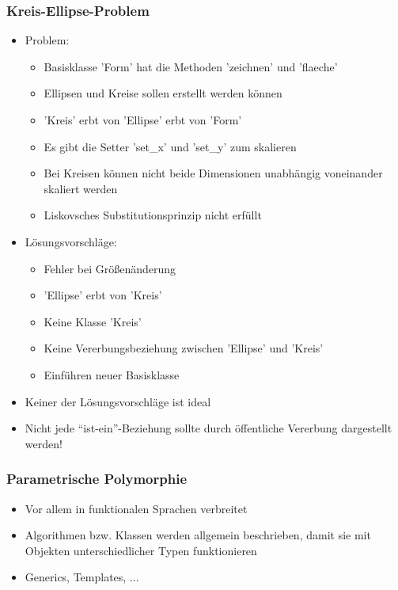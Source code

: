 {
\begin{frame}
	\frametitle{Kreis-Ellipse-Problem}
	\begin{itemize}
		\item Problem:
		\begin{itemize}
			\item Basisklasse 'Form' hat die Methoden 'zeichnen' und 'flaeche'
			\item Ellipsen und Kreise sollen erstellt werden können
			\item 'Kreis' erbt von 'Ellipse' erbt von 'Form'
			\item Es gibt die Setter 'set\_x' und 'set\_y' zum skalieren
			\item Bei Kreisen können nicht beide Dimensionen unabhängig voneinander skaliert werden
			\item Liskovsches Substitutionsprinzip nicht erfüllt
		\end{itemize}
		
		\item Lösungsvorschläge:
		\begin{itemize}
			\item Fehler bei Größenänderung
			\item 'Ellipse' erbt von 'Kreis'
			\item Keine Klasse 'Kreis'
			\item Keine Vererbungsbeziehung zwischen 'Ellipse' und 'Kreis'
			\item Einführen neuer Basisklasse
		\end{itemize}
		
		\item Keiner der Lösungsvorschläge ist ideal
		\item Nicht jede ``ist-ein''-Beziehung sollte durch öffentliche Vererbung dargestellt werden!
	\end{itemize}
\end{frame}
}


{
\begin{frame}
	\frametitle{Parametrische Polymorphie}
	\begin{itemize}
		\item Vor allem in funktionalen Sprachen verbreitet
		\item Algorithmen bzw. Klassen werden allgemein beschrieben, damit sie mit Objekten unterschiedlicher Typen funktionieren
		\item Generics, Templates, ...
	\end{itemize}
\end{frame}
}


